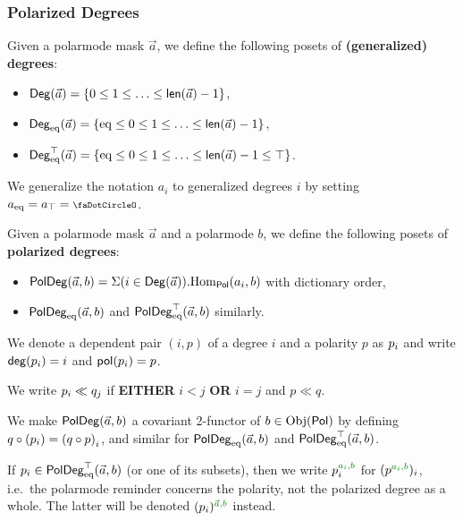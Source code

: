 \documentclass[a4paper]{memoir}
\begin{document}
\subsubsection{Polarized Degrees}
\begin{definition}
	Given a polarmode mask $\vec a$, we define the following posets of \textbf{(generalized) degrees}:
	\begin{itemize}
		\item $\Deg(\vec a) = \accol{0 \leq 1 \leq \ldots \leq \lenpol{\vec a} - 1}$,
		\item $\Degeq(\vec a) = \accol{\eqtydeg \leq 0 \leq 1 \leq \ldots \leq \lenpol{\vec a} - 1}$,
		\item $\Degeqtop(\vec a) = \accol{\eqtydeg \leq 0 \leq 1 \leq \ldots \leq \lenpol{\vec a} - 1 \leq \top}$.
	\end{itemize}
	We generalize the notation $a_i$ to generalized degrees $i$ by setting $a_\eqtydeg = a_\top = \npolar$.
\end{definition}
\begin{definition} \label{def:poldeg}
	Given a polarmode mask $\vec a$ and a polarmode $b$, we define the following posets of \textbf{polarized degrees}:
	\begin{itemize}
		\item $\poldeg(\vec a, b) = \Sigma(i \in \Deg(\vec a)).\Hom_\polcat(a_i, b)$ with dictionary order,
		\item $\poldegeq(\vec a, b)$ and $\poldegeqtop(\vec a, b)$ similarly.
	\end{itemize}
	We denote a dependent pair $(i, p)$ of a degree $i$ and a polarity $p$ as $\dpol i p$ and write $\getdeg(\dpol i p) = i$ and $\getpol(\dpol i p) = p$.
	
	We write $\dpol i p \ll \dpol j q$ if \textbf{EITHER} $i < j$ \textbf{OR} $i = j$ and $p \ll q$.
	
	We make $\poldeg(\vec a, b)$ a covariant 2-functor of $b \in \Obj(\polcat)$ by defining $q \circ (\dpol i p) = \dpol i {(q \circ p)}$, and similar for $\poldegeq(\vec a, b)$ and $\poldegeqtop(\vec a, b)$.
\end{definition}
\begin{notation} \label{not:polarmode-reminder-poldeg}
	If $p_i \in \poldegeqtop(\vec a, b)$ (or one of its subsets), then we write $p_i\pmrhom{a_i}{b}$ for $(p \pmrhom{a_i}{b})_i$, i.e.\ the polarmode reminder concerns the polarity, not the polarized degree as a whole.
	The latter will be denoted $(p_i) \pmrhom{\vec a}{b}$ instead.
\end{notation}
\end{document}
